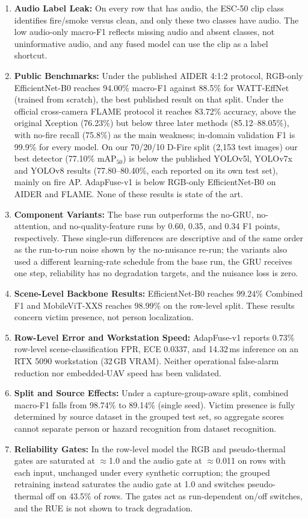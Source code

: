 \begin{enumerate}
    \item \textbf{Audio Label Leak:} On every row that has audio, the ESC-50 clip class identifies fire/smoke versus clean, and only these two classes have audio. The low audio-only macro-F1 reflects missing audio and absent classes, not uninformative audio, and any fused model can use the clip as a label shortcut.
    \item \textbf{Public Benchmarks:} Under the published AIDER 4:1:2 protocol, RGB-only EfficientNet-B0 reaches 94.00\% macro-F1 against 88.5\% for WATT-EffNet (trained from scratch), the best published result on that split. Under the official cross-camera FLAME protocol it reaches 83.72\% accuracy, above the original Xception (76.23\%) but below three later methods (85.12--88.05\%), with no-fire recall (75.8\%) as the main weakness; in-domain validation F1 is 99.9\% for every model. On our 70/20/10 D-Fire split (2{,}153 test images) our best detector (77.10\% mAP$_{50}$) is below the published YOLOv5l, YOLOv7x and YOLOv8 results (77.80--80.40\%, each reported on its own test set), mainly on fire AP. AdapFuse-v1 is below RGB-only EfficientNet-B0 on AIDER and FLAME. None of these results is state of the art.
    \item \textbf{Component Variants:} The base run outperforms the no-GRU, no-attention, and no-quality-feature runs by 0.60, 0.35, and 0.34 F1 points, respectively. These single-run differences are descriptive and of the same order as the run-to-run noise shown by the no-nuisance re-run; the variants also used a different learning-rate schedule from the base run, the GRU receives one step, reliability has no degradation targets, and the nuisance loss is zero.
    \item \textbf{Scene-Level Backbone Results:} EfficientNet-B0 reaches $99.24\%$ Combined F1 and MobileViT-XXS reaches $98.99\%$ on the row-level split. These results concern victim presence, not person localization.
    \item \textbf{Row-Level Error and Workstation Speed:} AdapFuse-v1 reports 0.73\% row-level scene-classification FPR, ECE 0.0337, and 14.32\,ms inference on an RTX 5090 workstation (32\,GB VRAM). Neither operational false-alarm reduction nor embedded-UAV speed has been validated.
    \item \textbf{Split and Source Effects:} Under a capture-group-aware split, combined macro-F1 falls from 98.74\% to 89.14\% (single seed). Victim presence is fully determined by source dataset in the grouped test set, so aggregate scores cannot separate person or hazard recognition from dataset recognition.
    \item \textbf{Reliability Gates:} In the row-level model the RGB and pseudo-thermal gates are saturated at $\approx$1.0 and the audio gate at $\approx$0.011 on rows with each input, unchanged under every synthetic corruption; the grouped retraining instead saturates the audio gate at 1.0 and switches pseudo-thermal off on 43.5\% of rows. The gates act as run-dependent on/off switches, and the RUE is not shown to track degradation.
\end{enumerate}
